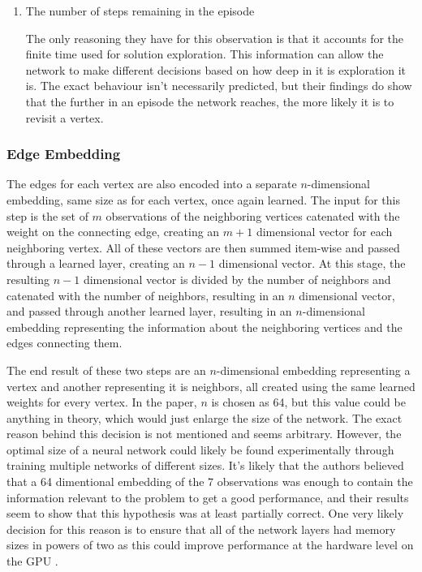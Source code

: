 \documentclass{article}
\begin{document}
\begin{enumerate}
    \item The number of steps remaining in the episode
    
    The only reasoning they have for this observation is that it accounts for the finite time used for solution exploration. This information can allow the network to make different decisions based on how deep in it is exploration it is. The exact behaviour isn't necessarily predicted, but their findings do show that the further in an episode the network reaches, the more likely it is to revisit a vertex. 

\end{enumerate}

\subsubsection{Edge Embedding}\label{sec:edge-embedding}

The edges for each vertex are also encoded into a separate $n$-dimensional embedding, same size as for each vertex, once again learned. The input for this step is the set of $m$ observations of the neighboring vertices catenated with the weight on the connecting edge, creating an $m + 1$ dimensional vector for each neighboring vertex. All of these vectors are then summed item-wise and passed through a learned layer, creating an $n - 1$ dimensional vector. At this stage, the resulting $n - 1$ dimensional vector is divided by the number of neighbors and catenated with the number of neighbors, resulting in an $n$ dimensional vector, and passed through another learned layer, resulting in an $n$-dimensional embedding representing the information about the neighboring vertices and the edges connecting them.

The end result of these two steps are an $n$-dimensional embedding representing a vertex and another representing it is neighbors, all created using the same learned weights for every vertex. In the paper, $n$ is chosen as 64, but this value could be anything in theory, which would just enlarge the size of the network. The exact reason behind this decision is not mentioned and seems arbitrary. However, the optimal size of a neural network could likely be found experimentally through training multiple networks of different sizes. It's likely that the authors believed that a 64 dimentional embedding of the 7 observations was enough to contain the information relevant to the problem to get a good performance, and their results seem to show that this hypothesis was at least partially correct. One very likely decision for this reason is to ensure that all of the network layers had memory sizes in powers of two as this could improve performance at the hardware level on the GPU \cite{cuda-practices}.
\end{document}
